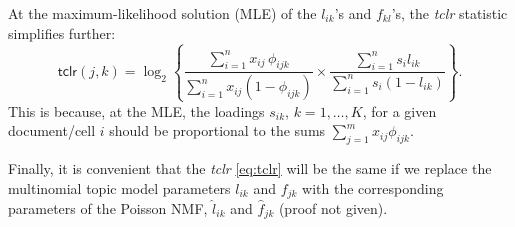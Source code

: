 \documentclass[final]{siamart171218}
\begin{document}
At the maximum-likelihood solution (MLE) of the $l_{ik}$'s and $f_{kl}$'s,
the {\em tclr} statistic simplifies further:
\begin{equation}
\mathsf{tclr}(j,k) = \log_2 \left\{ \frac{\sum_{i=1}^n x_{ij} \, \phi_{ijk}}
                       {\sum_{i=1}^n x_{ij} (1 - \phi_{ijk})} \times
                  \frac{\sum_{i=1}^n s_i l_{ik}}
                       {\sum_{i=1}^n s_i (1 - l_{ik})}
                  \right\}.
\end{equation}
This is because, at the MLE, the loadings $s_{ik}$, $k = 1, \ldots,
K$, for a given document/cell $i$ should be proportional to the sums
$\sum_{j=1}^m x_{ij} \phi_{ijk}$.

Finally, it is convenient that the {\em tclr} \eqref{eq:tclr} will be
the same if we replace the multinomial topic model parameters $l_{ik}$
and $f_{jk}$ with the corresponding parameters of the Poisson NMF,
$\hat{l}_{ik}$ and $\hat{f}_{jk}$ (proof not given).



\end{document}

